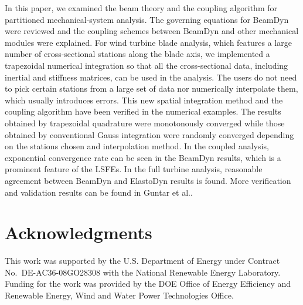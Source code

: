 \documentclass{aiaa-tc}
\begin{document}
In this paper, we examined the beam theory and the coupling algorithm for partitioned mechanical-system analysis. The governing equations for BeamDyn were reviewed and the coupling schemes between BeamDyn and other mechanical modules were explained. For wind turbine blade analysis, which features a large number of cross-sectional stations along the blade axis, we implemented a trapezoidal numerical integration so that all the cross-sectional data, including inertial and stiffness matrices, can be used in the analysis. The users do not need to pick certain stations from a large set of data nor numerically interpolate them, which usually introduces errors. This new spatial integration method and the coupling algorithm have been verified in the numerical examples. The results obtained by trapezoidal quadrature were monotonously converged while those obtained by conventional Gauss integration were randomly converged depending on the stations chosen and interpolation method. In the coupled analysis, exponential convergence rate can be seen in the BeamDyn results, which is a prominent feature of the LSFEs. In the full turbine analysis, reasonable agreement between BeamDyn and ElastoDyn results is found. More verification and validation results can be found in Guntar et al.\cite{Sri:SciTech2016}.
  
\section*{Acknowledgments} 

This work was supported by the U.S. Department of Energy under Contract No.\
DE-AC36-08GO28308 with the National Renewable Energy Laboratory. Funding for the work was provided by the DOE Office of Energy Efficiency and Renewable Energy, Wind and Water Power Technologies Office.   



\end{document}

